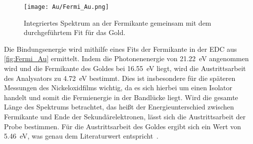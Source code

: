         \begin{figure}
            \centering
            \texttt{[image: Au/Fermi\_Au.png]}
            \caption{Integriertes Spektrum an der Fermikante gemeinsam mit dem durchgeführtem Fit für das Gold.}
            \label{fig:Fermi_Au}
        \end{figure}
        Die Bindungsenergie wird mithilfe eines Fits der Fermikante in der EDC aus \autoref{fig:Fermi_Au} ermittelt.
        Indem die Photonenenergie von \SI{21.22}{\electronvolt} angenommen wird und die Fermikante des Goldes bei \SI{16.55}{\electronvolt} liegt, wird die Austrittsarbeit des Analysators zu \SI{4.72}{\electronvolt} bestimmt.
        Dies ist insbesondere für die späteren Messungen des Nickeloxidfilms wichtig, da es sich hierbei um einen Isolator handelt und somit die Fermienergie in der Bandlücke liegt.
        Wird die gesamte Länge des Spektrums betrachtet, das heißt der Energieunterschied zwischen Fermikante und Ende der Sekundärelektronen, lässt sich die Austrittsarbeit der Probe bestimmen.
        Für die Austrittsarbeit des Goldes ergibt sich ein Wert von \SI{5.46}{\electronvolt}, was genau dem Literaturwert entspricht~\cite{5A_4}.
   
